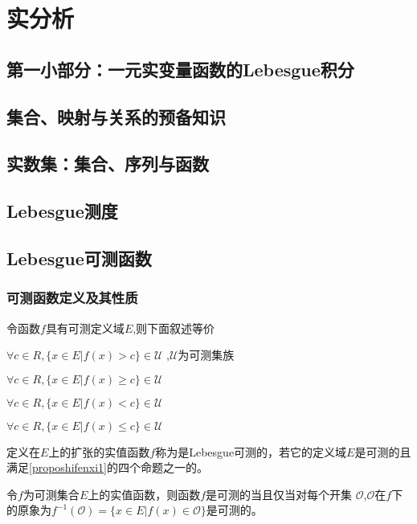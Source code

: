 \documentclass[12pt, a4paper, oneside, UTF8]{ctexbook}
\begin{document}
\else
\fi

\chapter{实分析}
\section*{第一小部分：一元实变量函数的Lebesgue积分}
\section*{集合、映射与关系的预备知识}

\section{实数集：集合、序列与函数}

\section{Lebesgue测度}


\section{Lebesgue可测函数}
\subsection{可测函数定义及其性质}
\begin{proposition}\label{proposhifenxi1}
	令函数$f$具有可测定义域$E$,则下面叙述等价
	\begin{change}
		\item $\forall c \in R,\{x\in E| f(x)>c\} \in \mathscr{U}$ ,$\mathscr{U}$为可测集族  
		\item $\forall c \in R,\{x\in E| f(x)\geqslant c\} \in \mathscr{U}$
		\item $\forall c \in R,\{x\in E| f(x)<c\} \in \mathscr{U}$
		\item $\forall c \in R,\{x\in E| f(x)\leqslant  c\} \in \mathscr{U}$
	\end{change}
\end{proposition}

\begin{defn}
	定义在$E$上的扩张的实值函数$f$称为是Lebesgue可测的，若它的定义域$E$是可测的且满足\cref{proposhifenxi1}的四个命题之一的。
\end{defn}

\begin{proposition}
	令$f$为可测集合$E$上的实值函数，则函数$f$是可测的当且仅当对每个开集 %
	$\mathcal{O}$,$\mathcal{O}$在$f$下的原象为$f^{-1}(\mathcal{O})=\{x \in E|f(x) \in \mathcal{O}\}$是可测的。
\end{proposition}		
\end{document}
